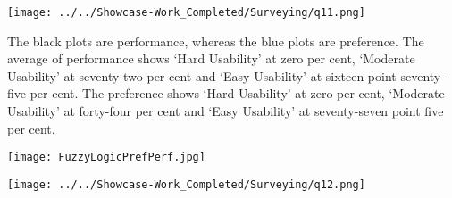 \begin{center}\vspace{1cm}
\texttt{[image: ../../Showcase-Work\_Completed/Surveying/q11.png]}
\label{fig:q-11}
\end{center}\vspace{1cm}

The black plots are performance, whereas the blue plots are preference. The average of performance shows `Hard Usability' at zero per cent, `Moderate Usability' at seventy-two per cent and `Easy Usability' at sixteen point seventy-five per cent. The preference shows `Hard Usability' at zero per cent, `Moderate Usability' at forty-four per cent and `Easy Usability' at seventy-seven point five per cent.

\begin{center}\vspace{1cm}
    \texttt{[image: FuzzyLogicPrefPerf.jpg]}
    \label{fig:fuzzyLogicPrefPerf}
\end{center}\vspace{1cm}

\begin{center}\vspace{1cm}
\texttt{[image: ../../Showcase-Work\_Completed/Surveying/q12.png]}
\label{fig:q-12}
\end{center}\vspace{1cm}